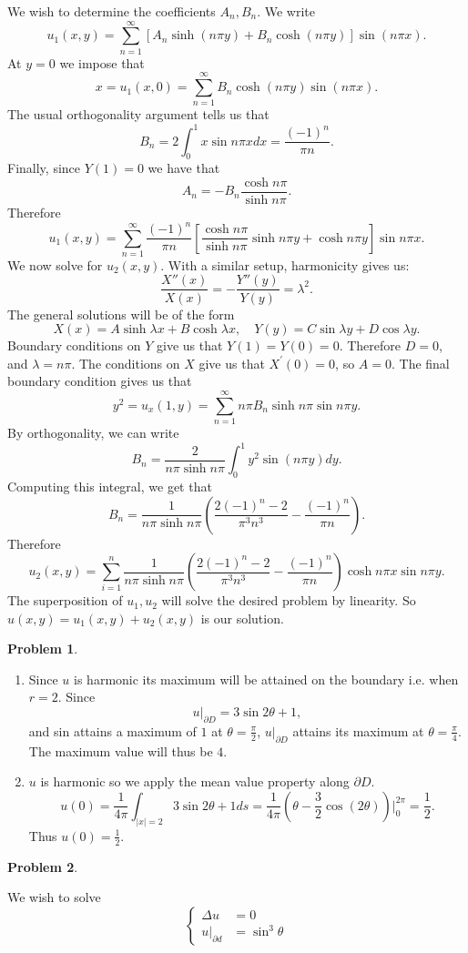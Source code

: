 \documentclass[12pt, a4paper]{article}
\newtheorem{problem}{Problem}
\theoremstyle{definition}
\newcommand{\penum}{ \begin{enumerate}[label=\bf(\alph*), leftmargin=0pt]}
\newcommand{\epenum}{ \end{enumerate} }
\newcommand{\bd}{\partial}
\begin{document}
We wish to determine the coefficients $A_n,B_n$.
We write $$u_1(x,y) = \sum_{n=1}^\infty \left[A_n \sinh (n\pi y) + B_n \cosh(n\pi y)\right] \sin (n\pi x).$$ 
At $y=0$ we impose that 
$$x = u_1(x,0) = \sum_{n=1}^\infty B_n \cosh(n\pi y) \sin (n\pi x).$$
The usual orthogonality argument tells us that 
$$B_n = 2 \int_0^1 x \sin n\pi x dx = \frac{(-1)^n}{\pi n}. $$
Finally, since $Y(1) = 0 $ we have that $$A_n = - B_n \frac{\cosh n\pi}{\sinh n\pi }.$$
Therefore $$u_1(x,y) = \sum_{n=1}^\infty \frac{(-1)^n}{\pi n} \left[ \frac{\cosh n\pi}{\sinh n \pi } \sinh n\pi y + \cosh n\pi y\right] \sin n\pi x.$$
We now solve for $u_2(x,y)$. With a similar setup, harmonicity gives us:
$$\frac{X''(x)}{X(x)} = - \frac{Y''(y)}{Y(y)} = \lambda^2.$$
The general solutions will be of the form $$X(x) = A \sinh \lambda x + B \cosh \lambda x, \quad Y(y)= C \sin \lambda y + D \cos \lambda y. $$
Boundary conditions on $Y$ give us that $Y(1)=Y(0) = 0$. Therefore $D = 0$, and $\lambda= n\pi$. The conditions on $X$ give us that $X^\prime(0) =0$, so $A = 0$. The final boundary condition gives us that 
$$y^2 = u_x(1,y) = \sum_{n=1}^\infty n\pi B_n \sinh n\pi  \sin n\pi y.$$
By orthogonality, we can write $$B_n = \frac{2}{n\pi \sinh n \pi } \int_0^1 y^2 \sin(n\pi y) dy.$$
Computing this integral, we get that $$B_n = \frac{1}{n\pi \sinh n\pi} \left( \frac{2(-1)^n - 2}{\pi^3 n^3} - \frac{(-1)^n}{\pi n }\right).$$
Therefore $$u_2(x,y) = \sum_{i=1}^n \frac{1}{n\pi \sinh n\pi} \left( \frac{2(-1)^n - 2}{\pi^3 n^3} - \frac{(-1)^n}{\pi n }\right) \cosh n\pi x \sin n\pi y.$$
The superposition of $u_1,u_2$ will solve the desired problem by linearity. So $u(x,y)= u_1(x,y) + u_2(x,y)$ is our solution. 
\newpage
\begin{problem}
\end{problem}
\penum
\item Since $u$ is harmonic its maximum will be attained on the boundary i.e. when $r = 2$. Since $$u|_{\bd D} = 3 \sin 2\theta +1,$$ and sin attains a maximum of $1$ at $\theta = \frac{\pi}{2} $, $u|_{\bd D}$ attains its maximum at $\theta = \frac{\pi}{4}$. The maximum value will thus be $4$. 
\item $u$ is harmonic so we apply the mean value property along $\bd D$. 
$$u(0) = \frac{1}{4\pi} \int_{|x| = 2} 3\sin 2\theta + 1 ds = \frac{1}{4\pi}\left(\theta -\frac{3}{2} \cos (2\theta) \right)\Big|_0^{2\pi} = \frac{1}{2}.$$
Thus $u(0) = \frac{1}{2}$. 
\epenum
\newpage
\begin{problem}
\end{problem}
We wish to solve 
$$\begin{cases}
	\Delta u & = 0\\
	u|_{\bd d} &= \sin^3 \theta
\end{cases}$$
\end{document}
